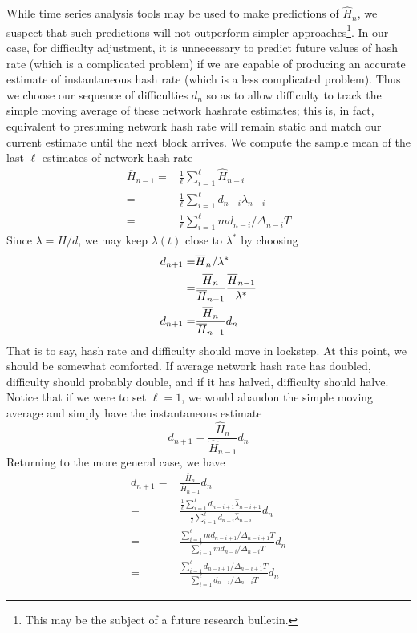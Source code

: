 \documentclass[12pt,english]{mrl}
\theoremstyle{definition}
\numberwithin{equation}{section}
\numberwithin{figure}{section}
\numberwithin{equation}{section}
\numberwithin{equation}{section}
\numberwithin{figure}{section}
\begin{document}
While time series analysis tools may be used to make predictions of $\hat{H}_n$, we suspect that such predictions will not outperform simpler approaches\footnote{This may be the subject of a future research bulletin.}. In our case, for difficulty adjustment, it is unnecessary to predict future values of hash rate (which is a complicated problem) if we are capable of producing an accurate estimate of instantaneous hash rate (which is a less complicated problem). Thus we choose our sequence of difficulties $d_n$ so as to allow difficulty to track the simple moving average of these network hashrate estimates; this is, in fact, equivalent to presuming network hash rate will remain static and match our current estimate until the next block arrives. We compute the sample mean of the last $\ell$ estimates of network hash rate
\begin{align*}
\overline{H}_{n-1} =& \frac{1}{\ell}\sum_{i=1}^{\ell} \hat{H}_{n-i}\\
 =& \frac{1}{\ell} \sum_{i=1}^{\ell} d_{n-i} \hat{\lambda}_{n-i}\\
 =& \frac{1}{\ell} \sum_{i=1}^{\ell} m d_{n-i} /\Delta_{n-i} T
\end{align*}
Since $\lambda = H/d$, we may keep $\lambda(t)$ close to $\lambda^*$ by choosing
\begin{align}
d_{n+1} =& \overline{H}_n/\lambda^* \notag \\
=& \frac{\overline{H}_n}{\overline{H}_{n-1}} \frac{\overline{H}_{n-1}}{\lambda^*}\notag \\
d_{n+1}=& \frac{\overline{H}_n}{\overline{H}_{n-1}} d_{n}\label{diffeq}
\end{align}
That is to say, hash rate and difficulty should move in lockstep. At this point, we should be somewhat comforted. If average network hash rate has doubled, difficulty should probably double, and if it has halved, difficulty should halve. Notice that if we were to set $\ell = 1$, we would abandon the simple moving average and simply have the instantaneous estimate
\[d_{n+1} = \frac{\hat{H}_{n}}{\hat{H}_{n-1}} d_n\]
Returning to the more general case, we have
\begin{align*}
d_{n+1}=& \frac{\overline{H}_n}{\overline{H}_{n-1}} d_{n}\\
=& \frac{\frac{1}{\ell} \sum_{i=1}^{\ell} d_{n-i+1} \hat{\lambda}_{n-i+1}}{\frac{1}{\ell} \sum_{i=1}^{\ell} d_{n-i} \hat{\lambda}_{n-i}} d_n\\
=& \frac{\sum_{i=1}^{\ell} m d_{n-i+1}/\Delta_{n-i+1} T}{\sum_{i=1}^{\ell} md_{n-i}/\Delta_{n-i} T}d_n\\
=& \frac{\sum_{i=1}^{\ell}  d_{n-i+1}/\Delta_{n-i+1} T}{\sum_{i=1}^{\ell} d_{n-i}/\Delta_{n-i} T}d_n
\end{align*}
\end{document}

